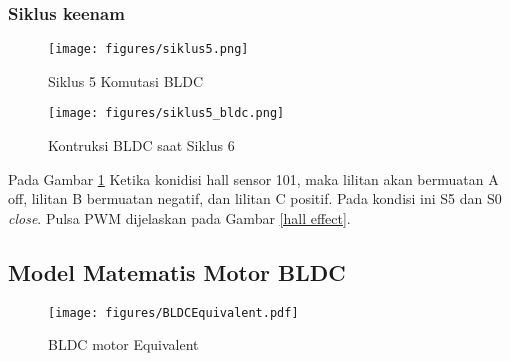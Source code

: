 \newpage
\subsubsection{Siklus keenam}
    \begin{figure}[!htb]
        \centering
        \texttt{[image: figures/siklus5.png]}
        \caption{Siklus 5 Komutasi BLDC}
        \label{siklus6}
    \end{figure}

    \begin{figure}[!htb]
        \centering
        \texttt{[image: figures/siklus5\_bldc.png]}
        \caption{Kontruksi BLDC saat Siklus 6}
    \end{figure}
Pada Gambar \ref{siklus6} Ketika konidisi hall sensor 101, maka lilitan akan bermuatan A off, lilitan B bermuatan negatif, dan lilitan C positif. Pada kondisi ini S5 dan S0 \textit{close}. Pulsa PWM dijelaskan pada Gambar \ref{hall effect}. 

\newpage

\subsection{Model Matematis Motor BLDC}

    \begin{figure}[!htb]
        \centering
        \texttt{[image: figures/BLDCEquivalent.pdf]}
        \caption{BLDC motor Equivalent}
        \label{BLDC}
    \end{figure}
    

